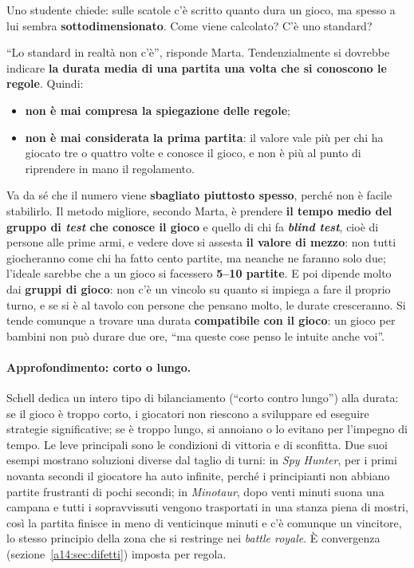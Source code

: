 Uno studente chiede: sulle scatole c'è scritto quanto dura un gioco, ma spesso a lui sembra
\textbf{sottodimensionato}. Come viene calcolato? C'è uno standard?

``Lo standard in realtà non c'è'', risponde Marta. Tendenzialmente si dovrebbe indicare
\textbf{la durata media di una partita una volta che si conoscono le regole}. Quindi:
\begin{itemize}
  \item \textbf{non è mai compresa la spiegazione delle regole};
  \item \textbf{non è mai considerata la prima partita}: il valore vale più per chi ha giocato
        tre o quattro volte e conosce il gioco, e non è più al punto di riprendere in mano il
        regolamento.
\end{itemize}
Va da sé che il numero viene \textbf{sbagliato piuttosto spesso}, perché non è facile
stabilirlo. Il metodo migliore, secondo Marta, è prendere \textbf{il tempo medio del gruppo di
\emph{test} che conosce il gioco} e quello di chi fa \textbf{\emph{blind test}}, cioè di persone
alle prime armi, e vedere dove si assesta \textbf{il valore di mezzo}: non tutti giocheranno come
chi ha fatto cento partite, ma neanche ne faranno solo due; l'ideale sarebbe che a un gioco si
facessero \textbf{5--10 partite}. E poi dipende molto dai \textbf{gruppi di gioco}: non c'è un
vincolo su quanto si impiega a fare il proprio turno, e se si è al tavolo con persone che
pensano molto, le durate cresceranno. Si tende comunque a trovare una durata
\textbf{compatibile con il gioco}: un gioco per bambini non può durare due ore, ``ma queste
cose penso le intuite anche voi''.

\paragraph{Approfondimento: corto o lungo.} Schell dedica un intero tipo di bilanciamento
(``corto contro lungo'') alla durata: se il gioco è troppo corto, i giocatori non riescono a
sviluppare ed eseguire strategie significative; se è troppo lungo, si annoiano o lo evitano
per l'impegno di tempo. Le leve principali sono le condizioni di vittoria e di sconfitta. Due
suoi esempi mostrano soluzioni diverse dal taglio di turni: in \emph{Spy Hunter}, per i primi
novanta secondi il giocatore ha auto infinite, perché i principianti non abbiano partite
frustranti di pochi secondi; in \emph{Minotaur}, dopo venti minuti suona una campana e tutti i
sopravvissuti vengono trasportati in una stanza piena di mostri, così la partita finisce in
meno di venticinque minuti e c'è comunque un vincitore, lo stesso principio della zona che si
restringe nei \emph{battle royale}. È convergenza (sezione~\ref{a14:sec:difetti}) imposta per
regola.

